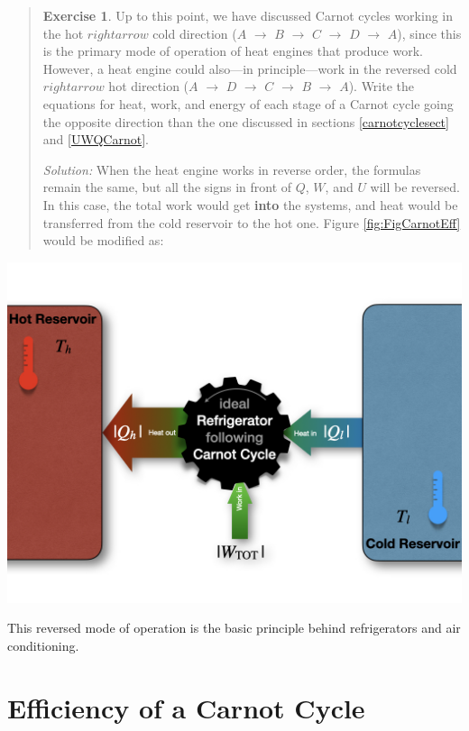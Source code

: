 \documentclass[
]{book}
\theoremstyle{definition}
\theoremstyle{definition}
\theoremstyle{definition}
\newtheorem{exercise}{Exercise}[chapter]
\theoremstyle{remark}
\begin{document}
\begin{quote}
\begin{exercise}
\protect\hypertarget{exr:CarnotEx}{}{\label{exr:CarnotEx} }Up to this point, we have discussed Carnot cycles working in the hot \(rightarrow\) cold direction (\(A\) \(\rightarrow\) \(B\) \(\rightarrow\) \(C\) \(\rightarrow\) \(D\) \(\rightarrow\) \(A\)), since this is the primary mode of operation of heat engines that produce work. However, a heat engine could also---in principle---work in the reversed cold \(rightarrow\) hot direction (\(A\) \(\rightarrow\) \(D\) \(\rightarrow\) \(C\) \(\rightarrow\) \(B\) \(\rightarrow\) \(A\)). Write the equations for heat, work, and energy of each stage of a Carnot cycle going the opposite direction than the one discussed in sections \ref{carnotcyclesect} and \ref{UWQCarnot}.

\emph{Solution:} When the heat engine works in reverse order, the formulas remain the same, but all the signs in front of \(Q\), \(W\), and \(U\) will be reversed. In this case, the total work would get \textbf{into} the systems, and heat would be transferred from the cold reservoir to the hot one. Figure \ref{fig:FigCarnotEff} would be modified as:
\end{exercise}
\end{quote}

\begin{flushright}\includegraphics[width=0.6\linewidth]{./img/OEP_Figures.010} \end{flushright}

This reversed mode of operation is the basic principle behind refrigerators and air conditioning.

\hypertarget{efficiency-of-a-carnot-cycle}{%
\section{Efficiency of a Carnot Cycle}\label{efficiency-of-a-carnot-cycle}}
\end{document}
